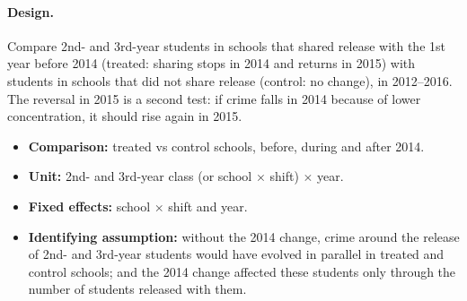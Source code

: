 \paragraph{Design.} Compare 2nd- and 3rd-year students in schools that shared
release with the 1st year before 2014 (treated: sharing stops in 2014 and
returns in 2015) with students in schools that did not share release (control:
no change), in 2012--2016. The reversal in 2015 is a second test: if crime
falls in 2014 because of lower concentration, it should rise again in 2015.

\begin{itemize}
  \item \textbf{Comparison:} treated vs control schools, before, during and
        after 2014.
  \item \textbf{Unit:} 2nd- and 3rd-year class (or school $\times$ shift)
        $\times$ year.
  \item \textbf{Fixed effects:} school $\times$ shift and year.
  \item \textbf{Identifying assumption:} without the 2014 change, crime around
        the release of 2nd- and 3rd-year students would have evolved in
        parallel in treated and control schools; and the 2014 change affected
        these students only through the number of students released with
        them.
\end{itemize}

